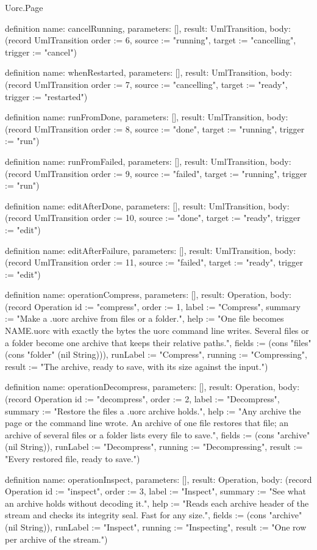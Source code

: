 \begin{lexlean}{Uorc.Page}
\begin{semanticmodule}
definition{
  name: cancelRunning,
  parameters: [],
  result: UmlTransition,
  body: (record UmlTransition {order := 6, source := "running", target := "cancelling", trigger := "cancel"})
}

definition{
  name: whenRestarted,
  parameters: [],
  result: UmlTransition,
  body: (record UmlTransition {order := 7, source := "cancelling", target := "ready", trigger := "restarted"})
}

definition{
  name: runFromDone,
  parameters: [],
  result: UmlTransition,
  body: (record UmlTransition {order := 8, source := "done", target := "running", trigger := "run"})
}

definition{
  name: runFromFailed,
  parameters: [],
  result: UmlTransition,
  body: (record UmlTransition {order := 9, source := "failed", target := "running", trigger := "run"})
}

definition{
  name: editAfterDone,
  parameters: [],
  result: UmlTransition,
  body: (record UmlTransition {order := 10, source := "done", target := "ready", trigger := "edit"})
}

definition{
  name: editAfterFailure,
  parameters: [],
  result: UmlTransition,
  body: (record UmlTransition {order := 11, source := "failed", target := "ready", trigger := "edit"})
}

definition{
  name: operationCompress,
  parameters: [],
  result: Operation,
  body: (record Operation {id := "compress", order := 1, label := "Compress", summary := "Make a .uorc archive from files or a folder.", help := "One file becomes NAME.uorc with exactly the bytes the uorc command line writes. Several files or a folder become one archive that keeps their relative paths.", fields := (cons "files" (cons "folder" (nil String))), runLabel := "Compress", running := "Compressing", result := "The archive, ready to save, with its size against the input."})
}

definition{
  name: operationDecompress,
  parameters: [],
  result: Operation,
  body: (record Operation {id := "decompress", order := 2, label := "Decompress", summary := "Restore the files a .uorc archive holds.", help := "Any archive the page or the command line wrote. An archive of one file restores that file; an archive of several files or a folder lists every file to save.", fields := (cons "archive" (nil String)), runLabel := "Decompress", running := "Decompressing", result := "Every restored file, ready to save."})
}

definition{
  name: operationInspect,
  parameters: [],
  result: Operation,
  body: (record Operation {id := "inspect", order := 3, label := "Inspect", summary := "See what an archive holds without decoding it.", help := "Reads each archive header of the stream and checks its integrity seal. Fast for any size.", fields := (cons "archive" (nil String)), runLabel := "Inspect", running := "Inspecting", result := "One row per archive of the stream."})
}


\end{semanticmodule}
\end{lexlean}

